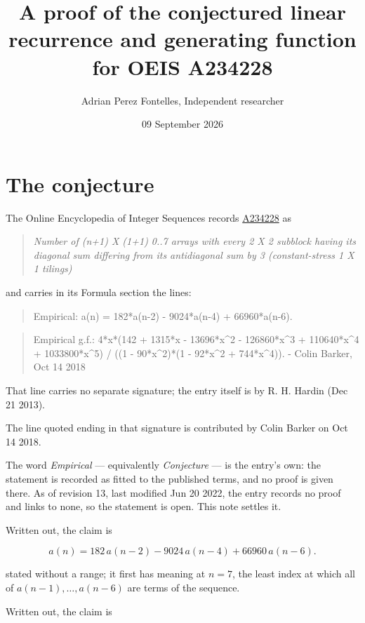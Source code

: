 \documentclass[11pt]{article}
\title{A proof of the conjectured linear recurrence and generating function for OEIS A234228}
\author{Adrian Perez Fontelles, Independent researcher}
\date{09 September 2026}
\theoremstyle{definition}
\begin{document}
\maketitle
\section{The conjecture}

The Online Encyclopedia of Integer Sequences records \href{https://oeis.org/A234228}{A234228} as

\begin{quote}\itshape Number of (n+1) X (1+1) 0..7 arrays with every 2 X 2 subblock having its diagonal sum differing from its antidiagonal sum by 3 (constant-stress 1 X 1 tilings)\end{quote}

and carries in its Formula section the lines:

\begin{quote}\ttfamily Empirical: a(n) = 182*a(n-2) - 9024*a(n-4) + 66960*a(n-6).\end{quote}

\begin{quote}\ttfamily Empirical g.f.: 4*x*(142 + 1315*x - 13696*x\textasciicircum{}2 - 126860*x\textasciicircum{}3 + 110640*x\textasciicircum{}4 + 1033800*x\textasciicircum{}5) / ((1 - 90*x\textasciicircum{}2)*(1 - 92*x\textasciicircum{}2 + 744*x\textasciicircum{}4)). - Colin Barker, Oct 14 2018\end{quote}

That line carries no separate signature; the entry itself is by R. H. Hardin (Dec 21 2013).

The line quoted ending in that signature is contributed by Colin Barker on Oct 14 2018.

The word {\itshape Empirical} --- equivalently {\itshape Conjecture} --- is the entry's own: the statement is recorded as fitted to the published terms, and no proof is given there. As of revision 13, last modified Jun 20 2022, the entry records no proof and links to none, so the statement is open. This note settles it.

Written out, the claim is

\[a(n) = 182\,a(n-2) - 9024\,a(n-4) + 66960\,a(n-6).\]

stated without a range; it first has meaning at $n = 7$, the least index at which all of $a(n-1),\dots,a(n-6)$ are terms of the sequence.

Written out, the claim is
\end{document}
